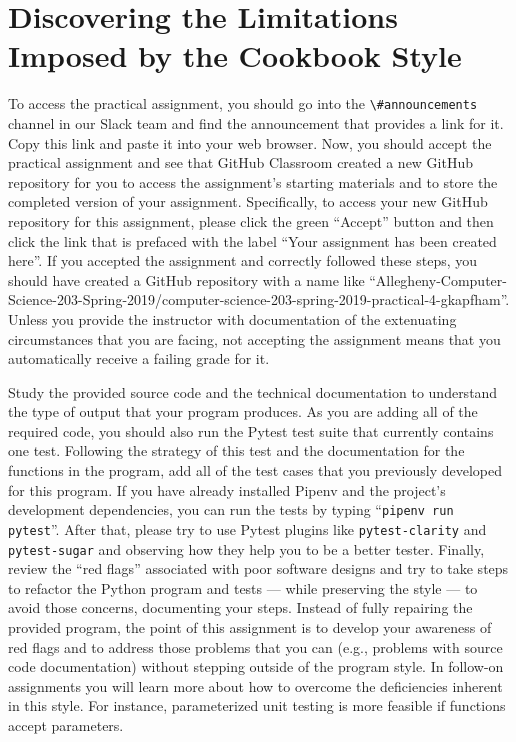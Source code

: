 \documentclass[11pt]{article}
\newcommand{\command}[1]{``\lstinline{#1}''}
\newcommand{\program}[1]{\lstinline{#1}}
\newcommand{\channel}[1]{\lstinline{#1}}
\begin{document}
\section*{Discovering the Limitations Imposed by the Cookbook Style}

To access the practical assignment, you should go into the
\channel{\#announcements} channel in our Slack team and find the announcement
that provides a link for it. Copy this link and paste it into your web browser.
Now, you should accept the practical assignment and see that GitHub Classroom
created a new GitHub repository for you to access the assignment's starting
materials and to store the completed version of your assignment. Specifically,
to access your new GitHub repository for this assignment, please click the green
``Accept'' button and then click the link that is prefaced with the label ``Your
assignment has been created here''. If you accepted the assignment and correctly
followed these steps, you should have created a GitHub repository with a name
like
``Allegheny-Computer-Science-203-Spring-2019/computer-science-203-spring-2019-practical-4-gkapfham''.
Unless you provide the instructor with documentation of the extenuating
circumstances that you are facing, not accepting the assignment means that you
automatically receive a failing grade for it.


Study the provided source code and the technical documentation to understand the
type of output that your program produces.
%
As you are adding all of the required code, you should also run the Pytest test
suite that currently contains one test. Following the strategy of this test and
the documentation for the functions in the program, add all of the test cases
that you previously developed for this program.
%
If you have already installed Pipenv and the project's development dependencies,
you can run the tests by typing \command{pipenv run pytest}.
%
After that, please try to use Pytest plugins like \program{pytest-clarity} and
\program{pytest-sugar} and observing how they help you to be a better tester.
%
Finally, review the ``red flags'' associated with poor software designs and try
to take steps to refactor the Python program and tests --- while preserving the
style --- to avoid those concerns, documenting your steps.
%
Instead of fully repairing the provided program, the point of this assignment is
to develop your awareness of red flags and to address those problems that you
can (e.g., problems with source code documentation) without stepping outside of
the program style.
%
In follow-on assignments you will learn more about how to overcome the
deficiencies inherent in this style.
%
For instance, parameterized unit testing is more feasible if functions accept
parameters.
\end{document}
